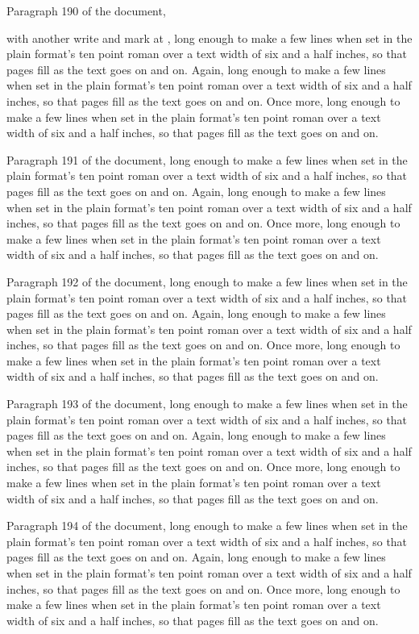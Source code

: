 Paragraph 190 of the document, \edef{}with another write and mark at \pc, long enough to make a few lines when set in the plain format's ten point roman over a text width of six and a half inches, so that pages fill as the text goes on and on. Again, long enough to make a few lines when set in the plain format's ten point roman over a text width of six and a half inches, so that pages fill as the text goes on and on. Once more, long enough to make a few lines when set in the plain format's ten point roman over a text width of six and a half inches, so that pages fill as the text goes on and on.

Paragraph 191 of the document, long enough to make a few lines when set in the plain format's ten point roman over a text width of six and a half inches, so that pages fill as the text goes on and on. Again, long enough to make a few lines when set in the plain format's ten point roman over a text width of six and a half inches, so that pages fill as the text goes on and on. Once more, long enough to make a few lines when set in the plain format's ten point roman over a text width of six and a half inches, so that pages fill as the text goes on and on.

Paragraph 192 of the document, long enough to make a few lines when set in the plain format's ten point roman over a text width of six and a half inches, so that pages fill as the text goes on and on. Again, long enough to make a few lines when set in the plain format's ten point roman over a text width of six and a half inches, so that pages fill as the text goes on and on. Once more, long enough to make a few lines when set in the plain format's ten point roman over a text width of six and a half inches, so that pages fill as the text goes on and on.

Paragraph 193 of the document, long enough to make a few lines when set in the plain format's ten point roman over a text width of six and a half inches, so that pages fill as the text goes on and on. Again, long enough to make a few lines when set in the plain format's ten point roman over a text width of six and a half inches, so that pages fill as the text goes on and on. Once more, long enough to make a few lines when set in the plain format's ten point roman over a text width of six and a half inches, so that pages fill as the text goes on and on.

Paragraph 194 of the document, long enough to make a few lines when set in the plain format's ten point roman over a text width of six and a half inches, so that pages fill as the text goes on and on. Again, long enough to make a few lines when set in the plain format's ten point roman over a text width of six and a half inches, so that pages fill as the text goes on and on. Once more, long enough to make a few lines when set in the plain format's ten point roman over a text width of six and a half inches, so that pages fill as the text goes on and on.

